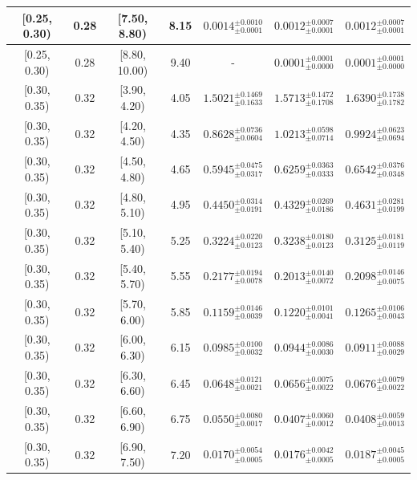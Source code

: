 \begin{longtable}{|c|c|c|c|c|c|c|}
\hline
[0.25, 0.30) & 0.28 & [7.50, 8.80) & 8.15 & $0.0014^{ \pm 0.0010 }_{ \pm 0.0001 }$ & $0.0012^{ \pm 0.0007 }_{ \pm 0.0001 }$ & $0.0012^{ \pm 0.0007 }_{ \pm 0.0001 }$ \\ 
\hline
[0.25, 0.30) & 0.28 & [8.80, 10.00) & 9.40 & - & $0.0001^{ \pm 0.0001 }_{ \pm 0.0000 }$ & $0.0001^{ \pm 0.0001 }_{ \pm 0.0000 }$ \\ 
\hline
[0.30, 0.35) & 0.32 & [3.90, 4.20) & 4.05 & $1.5021^{ \pm 0.1469 }_{ \pm 0.1633 }$ & $1.5713^{ \pm 0.1472 }_{ \pm 0.1708 }$ & $1.6390^{ \pm 0.1738 }_{ \pm 0.1782 }$ \\ 
\hline
[0.30, 0.35) & 0.32 & [4.20, 4.50) & 4.35 & $0.8628^{ \pm 0.0736 }_{ \pm 0.0604 }$ & $1.0213^{ \pm 0.0598 }_{ \pm 0.0714 }$ & $0.9924^{ \pm 0.0623 }_{ \pm 0.0694 }$ \\ 
\hline
[0.30, 0.35) & 0.32 & [4.50, 4.80) & 4.65 & $0.5945^{ \pm 0.0475 }_{ \pm 0.0317 }$ & $0.6259^{ \pm 0.0363 }_{ \pm 0.0333 }$ & $0.6542^{ \pm 0.0376 }_{ \pm 0.0348 }$ \\ 
\hline
[0.30, 0.35) & 0.32 & [4.80, 5.10) & 4.95 & $0.4450^{ \pm 0.0314 }_{ \pm 0.0191 }$ & $0.4329^{ \pm 0.0269 }_{ \pm 0.0186 }$ & $0.4631^{ \pm 0.0281 }_{ \pm 0.0199 }$ \\ 
\hline
[0.30, 0.35) & 0.32 & [5.10, 5.40) & 5.25 & $0.3224^{ \pm 0.0220 }_{ \pm 0.0123 }$ & $0.3238^{ \pm 0.0180 }_{ \pm 0.0123 }$ & $0.3125^{ \pm 0.0181 }_{ \pm 0.0119 }$ \\ 
\hline
[0.30, 0.35) & 0.32 & [5.40, 5.70) & 5.55 & $0.2177^{ \pm 0.0194 }_{ \pm 0.0078 }$ & $0.2013^{ \pm 0.0140 }_{ \pm 0.0072 }$ & $0.2098^{ \pm 0.0146 }_{ \pm 0.0075 }$ \\ 
\hline
[0.30, 0.35) & 0.32 & [5.70, 6.00) & 5.85 & $0.1159^{ \pm 0.0146 }_{ \pm 0.0039 }$ & $0.1220^{ \pm 0.0101 }_{ \pm 0.0041 }$ & $0.1265^{ \pm 0.0106 }_{ \pm 0.0043 }$ \\ 
\hline
[0.30, 0.35) & 0.32 & [6.00, 6.30) & 6.15 & $0.0985^{ \pm 0.0100 }_{ \pm 0.0032 }$ & $0.0944^{ \pm 0.0086 }_{ \pm 0.0030 }$ & $0.0911^{ \pm 0.0088 }_{ \pm 0.0029 }$ \\ 
\hline
[0.30, 0.35) & 0.32 & [6.30, 6.60) & 6.45 & $0.0648^{ \pm 0.0121 }_{ \pm 0.0021 }$ & $0.0656^{ \pm 0.0075 }_{ \pm 0.0022 }$ & $0.0676^{ \pm 0.0079 }_{ \pm 0.0022 }$ \\ 
\hline
[0.30, 0.35) & 0.32 & [6.60, 6.90) & 6.75 & $0.0550^{ \pm 0.0080 }_{ \pm 0.0017 }$ & $0.0407^{ \pm 0.0060 }_{ \pm 0.0012 }$ & $0.0408^{ \pm 0.0059 }_{ \pm 0.0013 }$ \\ 
\hline
[0.30, 0.35) & 0.32 & [6.90, 7.50) & 7.20 & $0.0170^{ \pm 0.0054 }_{ \pm 0.0005 }$ & $0.0176^{ \pm 0.0042 }_{ \pm 0.0005 }$ & $0.0187^{ \pm 0.0045 }_{ \pm 0.0005 }$ \\ 

\end{longtable}
